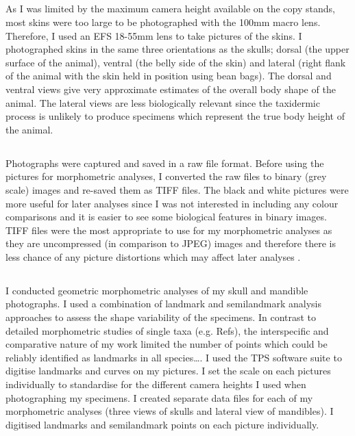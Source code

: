 \subsection{}
As I was limited by the maximum camera height available on the copy stands, most skins were too large to be photographed with the 100mm macro lens. Therefore, I used an EFS 18-55mm lens to take pictures of the skins. I photographed skins in the same three orientations as the skulls; dorsal (the upper surface of the animal), ventral (the belly side of the skin) and lateral (right flank of the animal with the skin held in position using bean bags). The dorsal and ventral views give very approximate estimates of the overall body shape of the animal. The lateral views are less biologically relevant since the taxidermic process is unlikely to produce specimens which represent the true body height of the animal.

\subsection{}
Photographs were captured and saved in a raw file format. Before using the pictures for morphometric analyses, I converted the raw files to binary (grey scale) images and re-saved them as TIFF files. The black and white pictures were more useful for later analyses since I was not interested in including any colour comparisons and it is easier to see some biological features in binary images. TIFF files were the most appropriate to use for my morphometric analyses as they are uncompressed (in comparison to JPEG) images and therefore there is less chance of any picture distortions which may affect later analyses \citep{HERC2013}.

\subsection{}

I conducted geometric morphometric analyses of my skull and mandible photographs. I used a combination of landmark and semilandmark analysis approaches to assess the shape variability of the specimens. In contrast to detailed morphometric studies of single taxa (e.g. Refs), the interspecific and comparative nature of my work limited the number of points which could be reliably identified as landmarks in all species….
I used the TPS software suite \citep{Rohlf2013} to digitise landmarks and curves on my pictures. I set the scale on each pictures individually to standardise for the different camera heights I used when photographing my specimens. I created separate data files for each of my morphometric analyses (three views of skulls and lateral view of mandibles). I digitised landmarks and semilandmark points on each picture individually.

